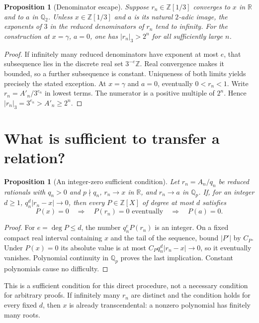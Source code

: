 \documentclass[11pt,a4paper]{article}
\newcommand{\Q}{\mathbb Q}
\newcommand{\R}{\mathbb R}
\newcommand{\Z}{\mathbb Z}
\newtheorem{proposition}[theorem]{Proposition}
\theoremstyle{definition}
\theoremstyle{remark}
\numberwithin{equation}{section}
\begin{document}
\begin{proposition}[Denominator escape]
\label{at:app:escape}
Suppose $r_n\in\Z[1/3]$ converges to $x$ in $\R$ and to $a$ in
$\Q_2$. Unless $x\in\Z[1/3]$ and $a$ is its natural $2$-adic image,
the exponents of $3$ in the reduced denominators of $r_n$ tend to infinity.
For the construction at $x=\gamma$, $a=0$, one has
$|r_n|_3>2^n$ for all sufficiently large $n$.
\end{proposition}
\begin{proof}
If infinitely many reduced denominators have exponent at most $e$, that
subsequence lies in the discrete real set $3^{-e}\Z$. Real convergence
makes it bounded, so a further subsequence is constant. Uniqueness of
both limits yields precisely the stated exception. At $x=\gamma$ and
$a=0$, eventually $0<r_n<1$. Write $r_n=A'_n/3^{e_n}$ in lowest terms.
The numerator is a positive multiple of $2^n$. Hence
$|r_n|_3=3^{e_n}>A'_n\ge2^n$.
\end{proof}

\section{What is sufficient to transfer a relation?}
\label{at:sec:grid}

\begin{proposition}[An integer-zero sufficient condition]
\label{at:grid:transfer}
Let $r_n=A_n/q_n$ be reduced rationals with $q_n>0$ and $p\nmid q_n$,
$r_n\to x$ in $\R$, and $r_n\to a$ in $\Q_p$. If, for an integer
$d\ge1$, $q_n^d|r_n-x|\to0$, then every $P\in\Z[X]$ of degree at most
$d$ satisfies
\[
 P(x)=0\quad\Longrightarrow\quad P(r_n)=0\text{ eventually}
 \quad\Longrightarrow\quad P(a)=0.
\]
\end{proposition}
\begin{proof}
For $e=\deg P\le d$, the number $q_n^eP(r_n)$ is an integer. On a
fixed compact real interval containing $x$ and the tail of the sequence,
bound $|P'|$ by $C_P$. Under $P(x)=0$ its absolute value is at most
$C_Pq_n^d|r_n-x|\to0$, so it eventually vanishes. Polynomial continuity
in $\Q_p$ proves the last implication. Constant polynomials cause no
difficulty.
\end{proof}

This is a sufficient condition for this direct procedure, not a necessary
condition for arbitrary proofs. If infinitely many $r_n$ are distinct and
the condition holds for every fixed $d$, then $x$ is already
transcendental: a nonzero polynomial has finitely many roots.
\end{document}

